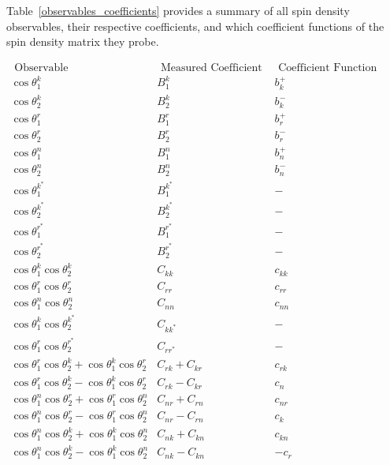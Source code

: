 Table~\ref{observables_coefficients} provides a summary of all spin density observables, their respective coefficients, and which coefficient functions of the spin density matrix they probe.
\begin{table}[htb]
\begin{center}
\begin{adjustbox}{scale=0.85,center}
\begin{math}
\begin{array}{l|l|l}
\hline \text { Observable } & \text { Measured Coefficient } & \text { Coefficient Function } \\
\hline 
\cos \theta_1^k & B_1^k & b_k^{+} \\
\cos \theta_2^k & B_2^k & b_k^{-} \\
\cos \theta_1^r & B_1^r & b_r^{+} \\
\cos \theta_2^r & B_2^r & b_r^{-} \\
\cos \theta_1^n & B_1^n & b_n^{+} \\
\cos \theta_2^n & B_2^n & b_n^{-} \\
\hline 
\cos \theta_1^{k^*} & B_1^{k^*} & - \\
\cos \theta_2^{k^*} & B_2^{k^*} & - \\
\cos \theta_1^{r^*} & B_1^{r^*} & - \\
\cos \theta_2^{r^*} & B_2^{r^*} & - \\
\hline 
\cos \theta_1^k \cos \theta_2^k & C_{k k} & c_{k k} \\
\cos \theta_1^r \cos \theta_2^r & C_{r r} & c_{r r} \\
\cos \theta_1^n \cos \theta_2^n & C_{n n} & c_{n n} \\
\hline 
\cos \theta_1^k \cos \theta_2^{k^*} & C_{k k^*} & - \\
\cos \theta_1^r \cos \theta_2^{r^*} & C_{r r^*} & - \\
\hline 
\cos \theta_1^r \cos \theta_2^k+\cos \theta_1^k \cos \theta_2^r & C_{r k}+C_{k r} & c_{r k} \\
\cos \theta_1^r \cos \theta_2^k-\cos \theta_1^k \cos \theta_2^r & C_{r k}-C_{k r} & c_n \\
\cos \theta_1^n \cos \theta_2^r+\cos \theta_1^r \cos \theta_2^n & C_{n r}+C_{r n} & c_{n r} \\
\cos \theta_1^n \cos \theta_2^r-\cos \theta_1^r \cos \theta_2^n & C_{n r}-C_{r n} & c_k \\
\cos \theta_1^n \cos \theta_2^k+\cos \theta_1^k \cos \theta_2^n & C_{n k}+C_{k n} & c_{k n} \\
\cos \theta_1^n \cos \theta_2^k-\cos \theta_1^k \cos \theta_2^n & C_{n k}-C_{k n} & -c_r \\

\end{array}
\end{math}
\end{adjustbox}
\end{center}
\end{table}
